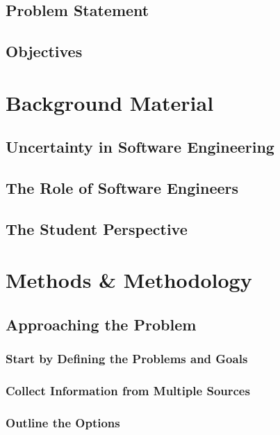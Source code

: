 \documentclass[a4paper,12pt]{report}
\begin{document}
\section{Problem Statement}
\section{Objectives}

\chapter{Background Material}
\section{Uncertainty in Software Engineering}
\section{The Role of Software Engineers}
\section{The Student Perspective}

\chapter{Methods \& Methodology}
\section{Approaching the Problem}
\subsection{Start by Defining the Problems and Goals}
\subsection{Collect Information from Multiple Sources}
\subsection{Outline the Options}
\end{document}
